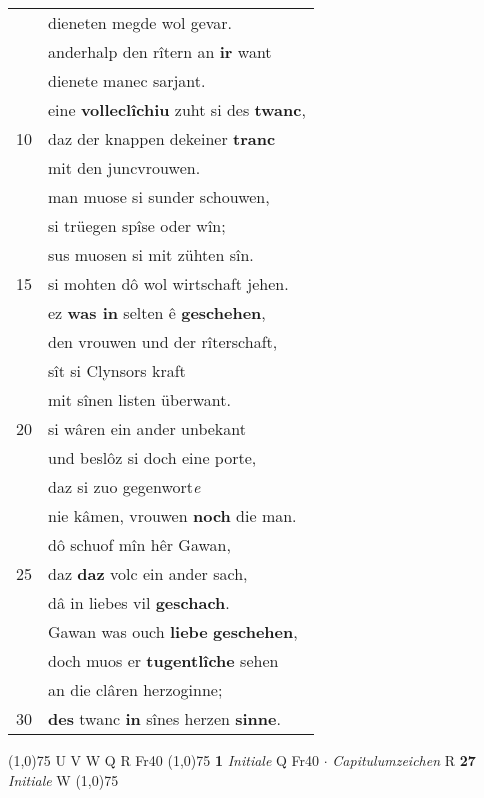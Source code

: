 \documentclass[8pt,a4paper,notitlepage]{article}
\begin{document}
\begin{table}[ht]
\begin{minipage}[t]{0.5\linewidth}
\begin{tabular}{rl}
 & dieneten megde wol gevar.\\ 
 & anderhalp den rîtern an \textbf{ir} want\\ 
 & dienete manec sarjant.\\ 
 & eine \textbf{volleclîchiu} zuht si des \textbf{twanc},\\ 
10 & daz der knappen dekeiner \textbf{tranc}\\ 
 & mit den juncvrouwen.\\ 
 & man muose si sunder schouwen,\\ 
 & si trüegen spîse oder wîn;\\ 
 & sus muosen si mit zühten sîn.\\ 
15 & si mohten dô wol wirtschaft jehen.\\ 
 & ez \textbf{was in} selten ê \textbf{geschehen},\\ 
 & den vrouwen und der rîterschaft,\\ 
 & sît si Clynsors kraft\\ 
 & mit sînen listen überwant.\\ 
20 & si wâren ein ander unbekant\\ 
 & und beslôz si doch eine porte,\\ 
 & daz si zuo gegenwort\textit{e}\\ 
 & nie kâmen, vrouwen \textbf{noch} die man.\\ 
 & dô schuof mîn hêr Gawan,\\ 
25 & daz \textbf{daz} volc ein ander sach,\\ 
 & dâ in liebes vil \textbf{geschach}.\\ 
 & Gawan was ouch \textbf{liebe} \textbf{geschehen},\\ 
 & doch muos er \textbf{tugentlîche} sehen\\ 
 & an die clâren herzoginne;\\ 
30 & \textbf{des} twanc \textbf{in} sînes herzen \textbf{sinne}.\\ 
\end{tabular}
\scriptsize
\line(1,0){75} \newline
U V W Q R Fr40 \newline
\line(1,0){75} \newline
\textbf{1} \textit{Initiale} Q Fr40   $\cdot$ \textit{Capitulumzeichen} R  \textbf{27} \textit{Initiale} W  \newline
\line(1,0){75} \newline

\end{minipage}
\end{table}
\end{document}
